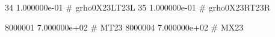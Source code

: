    34 1.000000e-01 # grho0X23LT23L 
   35 1.000000e-01 # grho0X23RT23R 

  8000001 7.000000e+02 # MT23 
  8000004 7.000000e+02 # MX23 
